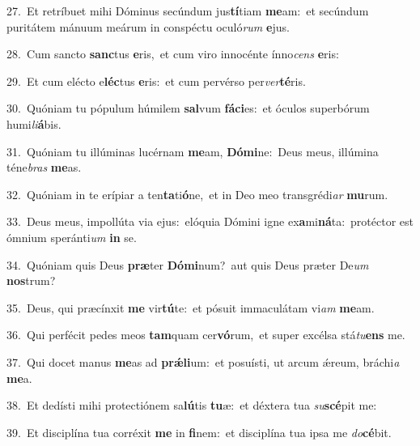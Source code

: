 {\numbfont\textcolor{\numbcolor}{27.}}~Et retríbuet mihi Dóminus secúndum jus\-\textbf{tí}\-tiam \textbf{me}\-am:~\star et secúndum puritátem mánuum meárum in conspéctu oculó\textit{rum} \textbf{e}\-jus.\par
{\numbfont\textcolor{\numbcolor}{28.}}~Cum sancto \textbf{sanc}\-tus \textbf{e}\-ris,~\star et cum viro innocénte ínno\textit{cens} \textbf{e}\-ris:\par
{\numbfont\textcolor{\numbcolor}{29.}}~Et cum elécto e\-\textbf{léc}\-tus \textbf{e}\-ris:~\star et cum pervérso per\-\textit{ver}\-\textbf{té}ris.\par
{\numbfont\textcolor{\numbcolor}{30.}}~Quóniam tu pópulum húmilem \textbf{sal}\-vum \textbf{fá}\-\textbf{ci}es:~\star et óculos superbórum humi\-\textit{li}\-\textbf{á}bis.\par
{\numbfont\textcolor{\numbcolor}{31.}}~Quóniam tu illúminas lucérnam \textbf{me}\-am, \textbf{Dó}\-\textbf{mi}ne:~\star Deus meus, illúmina téne\textit{bras} \textbf{me}\-as.\par
{\numbfont\textcolor{\numbcolor}{32.}}~Quóniam in te erípiar a ten\-\textbf{ta}\-ti\-\textbf{ó}\-ne,~\star et in Deo meo transgrédi\textit{ar} \textbf{mu}\-rum.\par
{\numbfont\textcolor{\numbcolor}{33.}}~Deus meus, impollúta via ejus:~\dagger elóquia Dómini igne ex\-\textbf{a}\-mi\-\textbf{ná}\-ta:~\star protéctor est ómnium speránti\textit{um} \textbf{in} se.\par
{\numbfont\textcolor{\numbcolor}{34.}}~Quóniam quis Deus \textbf{præ}\-ter \textbf{Dó}\-\textbf{mi}num?~\star aut quis Deus præter De\textit{um} \textbf{nos}\-trum?\par
{\numbfont\textcolor{\numbcolor}{35.}}~Deus, qui præcínxit \textbf{me} vir\-\textbf{tú}\-te:~\star et pósuit immaculátam vi\textit{am} \textbf{me}\-am.\par
{\numbfont\textcolor{\numbcolor}{36.}}~Qui perfécit pedes meos \textbf{tam}\-quam cer\-\textbf{vó}\-rum,~\star et super excélsa stá\-\textit{tu}\-\textbf{ens} me.\par
{\numbfont\textcolor{\numbcolor}{37.}}~Qui docet manus \textbf{me}\-as ad \textbf{prǽ}\-\textbf{li}um:~\star et posuísti, ut arcum ǽreum, bráchi\textit{a} \textbf{me}\-a.\par
{\numbfont\textcolor{\numbcolor}{38.}}~Et dedísti mihi protectiónem sa\-\textbf{lú}\-tis \textbf{tu}\-æ:~\star et déxtera tua \textit{su}\-\textbf{scé}pit me:\par
{\numbfont\textcolor{\numbcolor}{39.}}~Et disciplína tua corréxit \textbf{me} in \textbf{fi}\-nem:~\star et disciplína tua ipsa me \textit{do}\-\textbf{cé}bit.\par
